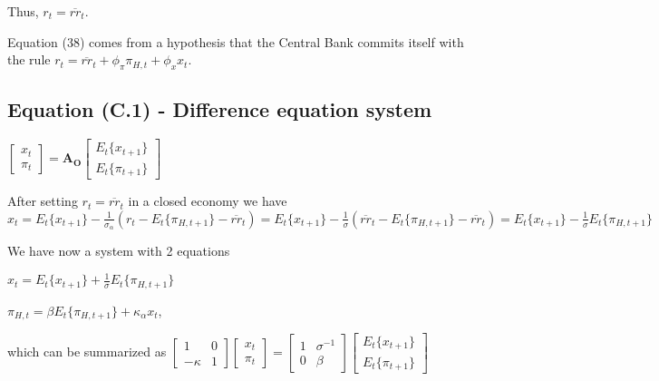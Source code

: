 \documentclass[
]{article}
\begin{document}
Thus, \(r_t=\overline{rr}_t\).

Equation (38) comes from a hypothesis that the Central Bank commits
itself with the rule
\(r_t=\overline{rr}_t+\phi_\pi \pi_{H,t}+\phi_x x_t\).

\vspace{12pt}

\hypertarget{equation-c.1---difference-equation-system}{%
\subsection{Equation (C.1) - Difference equation
system}\label{equation-c.1---difference-equation-system}}

\(\displaystyle \left[ \begin{matrix} x_t\\ \pi_t \end{matrix} \right] =\mathbf{A_O} \left[ \begin{matrix} E_t\{x_{t+1} \}\\ E_t \{\pi_{t+1} \} \end{matrix} \right]\)

\vspace{8pt}

After setting \(r_t=\overline{rr}_t\) in a closed economy we have
\(\displaystyle x_t = E_t\{x_{t+1}\} -\frac{1}{\sigma_\alpha}(r_t-E_t\{\pi_{H,t+1}\} -\overline{rr}_t) = E_t\{x_{t+1}\} -\frac{1}{\sigma}(\overline{rr}_t-E_t\{\pi_{H,t+1}\} -\overline{rr}_t) = E_t\{x_{t+1}\} -\frac{1}{\sigma}E_t\{\pi_{H,t+1}\}\)

We have now a system with 2 equations

\(\displaystyle x_t = E_t\{x_{t+1}\} +\frac{1}{\sigma}E_t\{\pi_{H,t+1}\}\)

\(\pi_{H,t}=\beta E_t\{ \pi_{H,t+1}\} + \kappa_\alpha x_t\),

which can be summarized as
\(\displaystyle \left[ \begin{matrix} 1 & 0\\ -\kappa & 1 \end{matrix} \right] \left[ \begin{matrix} x_t\\ \pi_t \end{matrix} \right] = \left[ \begin{matrix} 1 & \sigma^{-1} \\ 0 & \beta \end{matrix} \right] \left[ \begin{matrix} E_t\{x_{t+1} \}\\ E_t \{\pi_{t+1} \} \end{matrix} \right]\)
\end{document}
